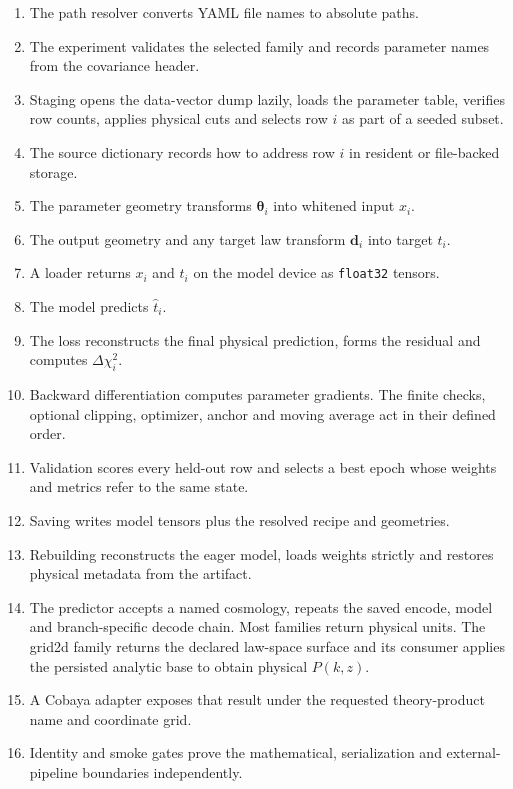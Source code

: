 \documentclass[10pt,aps,prd,twocolumn,nofootinbib]{revtex4-2}
\newcommand{\code}[1]{\texttt{#1}}
\newcommand{\btheta}{\boldsymbol{\theta}}
\newcommand{\bd}{\mathbf{d}}
\begin{document}
\begin{enumerate}
  \item The path resolver converts YAML file names to absolute paths.
  \item The experiment validates the selected family and records parameter
        names from the covariance header.
  \item Staging opens the data-vector dump lazily, loads the parameter table,
        verifies row counts, applies physical cuts and selects row $i$ as
        part of a seeded subset.
  \item The source dictionary records how to address row $i$ in resident or
        file-backed storage.
  \item The parameter geometry transforms $\btheta_i$ into whitened input
        $x_i$.
  \item The output geometry and any target law transform $\bd_i$ into target
        $t_i$.
  \item A loader returns $x_i$ and $t_i$ on the model device as
        \code{float32} tensors.
  \item The model predicts $\widehat t_i$.
  \item The loss reconstructs the final physical prediction, forms the
        residual and computes $\Delta\chi_i^2$.
  \item Backward differentiation computes parameter gradients.  The finite
        checks, optional clipping, optimizer, anchor and moving average act in
        their defined order.
  \item Validation scores every held-out row and selects a best epoch whose
        weights and metrics refer to the same state.
  \item Saving writes model tensors plus the resolved recipe and geometries.
  \item Rebuilding reconstructs the eager model, loads weights strictly and
        restores physical metadata from the artifact.
  \item The predictor accepts a named cosmology, repeats the saved encode,
        model and branch-specific decode chain.  Most families return physical
        units.  The grid2d family returns the declared law-space surface and its consumer
        applies the persisted analytic base to obtain physical $P(k,z)$.
  \item A Cobaya adapter exposes that result under the requested theory-product
        name and coordinate grid.
  \item Identity and smoke gates prove the mathematical, serialization and
        external-pipeline boundaries independently.
\end{enumerate}
\end{document}
